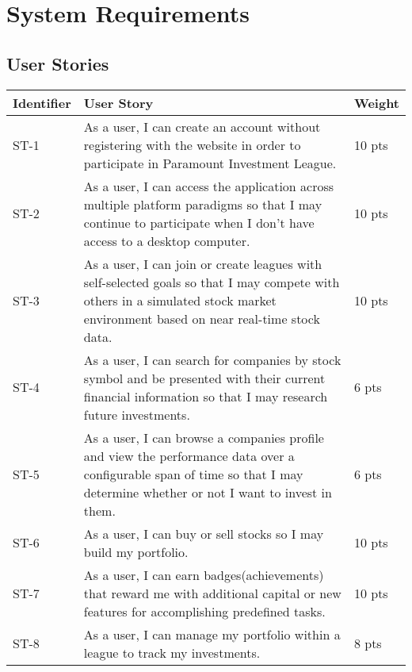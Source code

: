 \chapter{System Requirements}

\section{User Stories}

\renewcommand\arraystretch{2}
\begin{longtable}{|p{0.6in}|p{4.6in}|p{0.5in}|}
\hline
{\large \color{color1}Identifier}&{\large \color{color1}User Story}&{\large
  \color{color1}Weight} \\ \hline
ST-1&As a user, I can create an account without registering with the website
in order to participate in Paramount Investment League.&10 pts \\ \hline

ST-2&As a user, I can access the application across multiple platform paradigms
so that I may continue to participate when I don't have access to a desktop
computer.&10 pts \\ \hline

ST-3&As a user, I can join or create leagues with self-selected goals so that I
may compete with others in a simulated stock market environment based on
near real-time stock data.&10 pts \\ \hline

ST-4&As a user, I can search for companies by stock symbol and be presented with
their current financial information so that I may research future investments.&6
pts  \\ \hline

ST-5&As a user, I can browse a companies profile and view the performance data
over a configurable span of time so that I may determine whether or not I want
to invest in them.&6 pts  \\ \hline

ST-6&As a user, I can buy or sell stocks so I may build my portfolio.&10 pts
\\ \hline

ST-7&As a user, I can earn badges(achievements) that reward me with additional
capital or new features for accomplishing predefined tasks.&10 pts \\ \hline

ST-8&As a user, I can manage my portfolio within a league to track my
investments.&8 pts  \\ \hline


\end{longtable}
